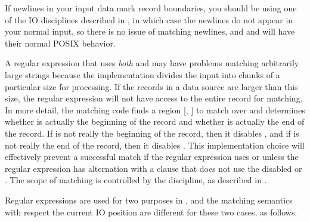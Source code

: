 If newlines in your input data mark record boundaries, you
should be using one of the  IO disciplines described in
, in which case the newlines 
do not appear in your normal input, so there is no issue of 
matching newlines, and  and  will
have their normal POSIX behavior.


A regular expression that uses \textit{both}  and
 may have problems matching arbitrarily large
strings because the implementation divides the input into chunks of a
particular size for processing. If the records in a data source are
larger than this size, the regular expression will not have access to
the entire record for matching.  In more detail, the matching code
finds a region [, ] to match over and determines
whether  is actually the beginning of the record and whether
 is actually the end of the record.  If  is not
really the beginning of the record, then it disables ,
and if  is not really the end of the record, then it disables
.  This implementation choice will effectively
prevent a successful match if the regular expression uses
 or  unless the regular
expression has alternation with a clause that does not use the
disabled  or .  The scope of
matching is controlled by the \pads{} discipline, as described in
.




Regular expressions are used for two purposes in \pads{},
and the matching semantics with respect the current IO position
are different for these two cases, as follows.

